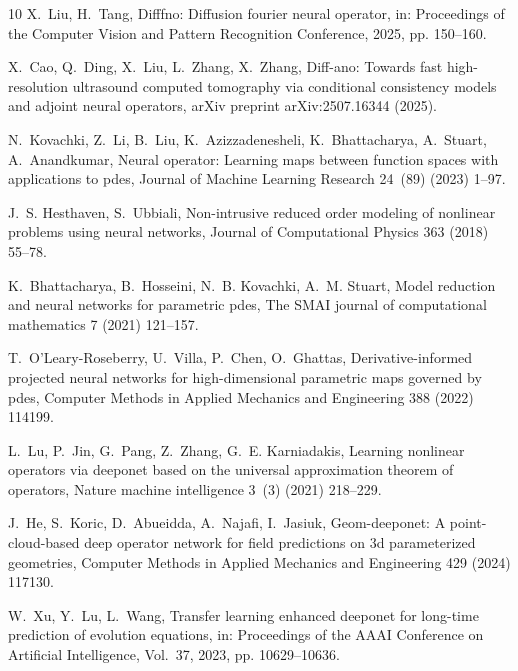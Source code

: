 \documentclass[preprint,numbers,sort&compress]{elsarticle}
\begin{document}
\begin{thebibliography}{10}
				X.~Liu, H.~Tang, Difffno: Diffusion fourier neural operator, in: Proceedings of
				the Computer Vision and Pattern Recognition Conference, 2025, pp. 150--160.
				
				X.~Cao, Q.~Ding, X.~Liu, L.~Zhang, X.~Zhang, Diff-ano: Towards fast
				high-resolution ultrasound computed tomography via conditional consistency
				models and adjoint neural operators, arXiv preprint arXiv:2507.16344 (2025).
				
				N.~Kovachki, Z.~Li, B.~Liu, K.~Azizzadenesheli, K.~Bhattacharya, A.~Stuart,
				A.~Anandkumar, Neural operator: Learning maps between function spaces with
				applications to pdes, Journal of Machine Learning Research 24~(89) (2023)
				1--97.
				
				J.~S. Hesthaven, S.~Ubbiali, Non-intrusive reduced order modeling of nonlinear
				problems using neural networks, Journal of Computational Physics 363 (2018)
				55--78.
				
				K.~Bhattacharya, B.~Hosseini, N.~B. Kovachki, A.~M. Stuart, Model reduction and
				neural networks for parametric pdes, The SMAI journal of computational
				mathematics 7 (2021) 121--157.
				
				T.~O’Leary-Roseberry, U.~Villa, P.~Chen, O.~Ghattas, Derivative-informed
				projected neural networks for high-dimensional parametric maps governed by
				pdes, Computer Methods in Applied Mechanics and Engineering 388 (2022)
				114199.
				
				L.~Lu, P.~Jin, G.~Pang, Z.~Zhang, G.~E. Karniadakis, Learning nonlinear
				operators via deeponet based on the universal approximation theorem of
				operators, Nature machine intelligence 3~(3) (2021) 218--229.
				
				J.~He, S.~Koric, D.~Abueidda, A.~Najafi, I.~Jasiuk, Geom-deeponet: A
				point-cloud-based deep operator network for field predictions on 3d
				parameterized geometries, Computer Methods in Applied Mechanics and
				Engineering 429 (2024) 117130.
				
				W.~Xu, Y.~Lu, L.~Wang, Transfer learning enhanced deeponet for long-time
				prediction of evolution equations, in: Proceedings of the AAAI Conference on
				Artificial Intelligence, Vol.~37, 2023, pp. 10629--10636.
				

\end{thebibliography}
\end{document}
